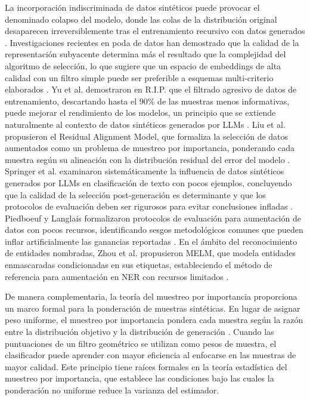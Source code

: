 La incorporación indiscriminada de datos sintéticos puede provocar el denominado colapso del modelo, donde las colas de la distribución original desaparecen irreversiblemente tras el entrenamiento recursivo con datos generados \cite{shumailov2023curse}. Investigaciones recientes en poda de datos han demostrado que la calidad de la representación subyacente determina más el resultado que la complejidad del algoritmo de selección, lo que sugiere que un espacio de embeddings de alta calidad con un filtro simple puede ser preferible a esquemas multi-criterio elaborados \cite{du2025disentangling}. Yu et al. demostraron en R.I.P. que el filtrado agresivo de datos de entrenamiento, descartando hasta el 90\% de las muestras menos informativas, puede mejorar el rendimiento de los modelos, un principio que se extiende naturalmente al contexto de datos sintéticos generados por LLMs \cite{yu2025rip}. Liu et al. propusieron el Residual Alignment Model, que formaliza la selección de datos aumentados como un problema de muestreo por importancia, ponderando cada muestra según su alineación con la distribución residual del error del modelo \cite{liu2025ram}. Springer et al. examinaron sistemáticamente la influencia de datos sintéticos generados por LLMs en clasificación de texto con pocos ejemplos, concluyendo que la calidad de la selección post-generación es determinante y que los protocolos de evaluación deben ser rigurosos para evitar conclusiones infladas \cite{springer2025influence}. Piedboeuf y Langlais formalizaron protocolos de evaluación para aumentación de datos con pocos recursos, identificando sesgos metodológicos comunes que pueden inflar artificialmente las ganancias reportadas \cite{piedboeuf2024evaluation}. En el ámbito del reconocimiento de entidades nombradas, Zhou et al. propusieron MELM, que modela entidades enmascaradas condicionadas en sus etiquetas, estableciendo el método de referencia para aumentación en NER con recursos limitados \cite{zhou2022melm}.

De manera complementaria, la teoría del muestreo por importancia proporciona un marco formal para la ponderación de muestras sintéticas. En lugar de asignar peso uniforme, el muestreo por importancia pondera cada muestra según la razón entre la distribución objetivo y la distribución de generación \cite{tokdar2010importance}. Cuando las puntuaciones de un filtro geométrico se utilizan como pesos de muestra, el clasificador puede aprender con mayor eficiencia al enfocarse en las muestras de mayor calidad. Este principio tiene raíces formales en la teoría estadística del muestreo por importancia, que establece las condiciones bajo las cuales la ponderación no uniforme reduce la varianza del estimador.

